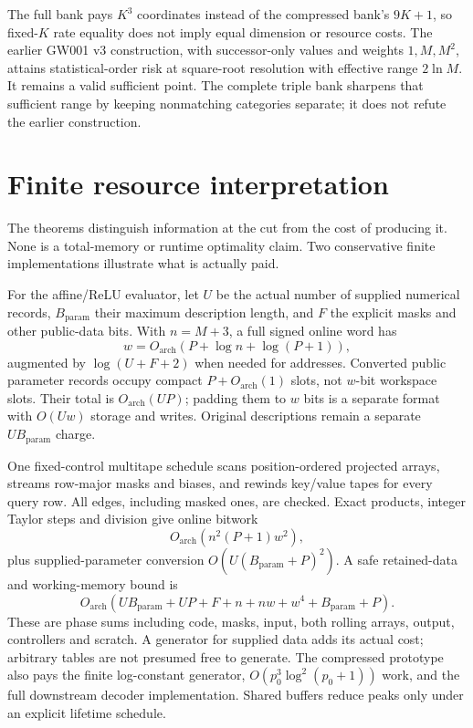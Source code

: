 \documentclass[11pt,letterpaper]{article}
\theoremstyle{definition}\newtheorem{definition}[theorem]{Definition}
\theoremstyle{remark}\newtheorem{remark}[theorem]{Remark}
\newcommand{\unit}[1]{\textsf{#1}}
\begin{document}
The full bank pays $K^3$ coordinates instead of the compressed bank's $9K+1$, so fixed-$K$ rate equality does not imply equal dimension or resource costs. The earlier \unit{GW001 v3} construction, with successor-only values and weights $1,M,M^2$, attains statistical-order risk at square-root resolution with effective range $2\ln M$. It remains a valid sufficient point. The complete triple bank sharpens that sufficient range by keeping nonmatching categories separate; it does not refute the earlier construction.

\section{Finite resource interpretation}\label{sec:costs}
The theorems distinguish information at the cut from the cost of producing it. None is a total-memory or runtime optimality claim. Two conservative finite implementations illustrate what is actually paid.

For the affine/ReLU evaluator, let $U$ be the actual number of supplied numerical records, $B_{\mathrm{param}}$ their maximum description length, and $F$ the explicit masks and other public-data bits. With $n=M+3$, a full signed online word has
\[
 w=O_{\mathrm{arch}}(P+\log n+\log(P+1)),
\]
augmented by $\log(U+F+2)$ when needed for addresses. Converted public parameter records occupy compact $P+O_{\mathrm{arch}}(1)$ slots, not $w$-bit workspace slots. Their total is $O_{\mathrm{arch}}(UP)$; padding them to $w$ bits is a separate format with $O(Uw)$ storage and writes. Original descriptions remain a separate $UB_{\mathrm{param}}$ charge.

One fixed-control multitape schedule scans position-ordered projected arrays, streams row-major masks and biases, and rewinds key/value tapes for every query row. All edges, including masked ones, are checked. Exact products, integer Taylor steps and division give online bitwork
\[
 O_{\mathrm{arch}}(n^2(P+1)w^2),
\]
plus supplied-parameter conversion $O(U(B_{\mathrm{param}}+P)^2)$. A safe retained-data and working-memory bound is
\[
 O_{\mathrm{arch}}(UB_{\mathrm{param}}+UP+F+n+nw+w^4+B_{\mathrm{param}}+P).
\]
These are phase sums including code, masks, input, both rolling arrays, output, controllers and scratch. A generator for supplied data adds its actual cost; arbitrary tables are not presumed free to generate. The compressed prototype also pays the finite log-constant generator, $O(p_0^3\log^2(p_0+1))$ work, and the full downstream decoder implementation. Shared buffers reduce peaks only under an explicit lifetime schedule.
\end{document}
